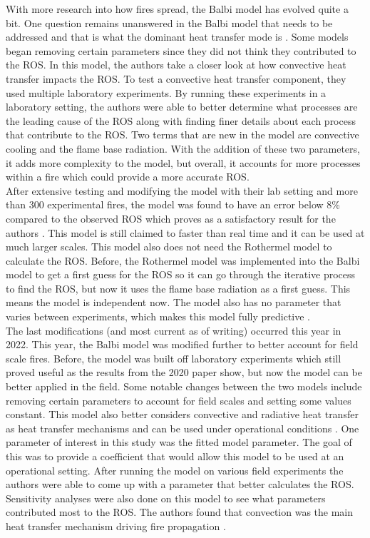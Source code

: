 \documentclass{article}
\begin{document}
\indent With more research into how fires spread, the Balbi model has evolved quite a bit. One question remains unanswered in the Balbi model that needs to be addressed and that is what the dominant heat transfer mode is \citep{Balbi2020}. Some models began removing certain parameters since they did not think they contributed to the ROS. In this model, the authors take a closer look at how convective heat transfer impacts the ROS. To test a convective heat transfer component, they used multiple laboratory experiments. By running these experiments in a laboratory setting, the authors were able to better determine what processes are the leading cause of the ROS along with finding finer details about each process that contribute to the ROS. Two terms that are new in the model are convective cooling and the flame base radiation. With the addition of these two parameters, it adds more complexity to the model, but overall, it accounts for more processes within a fire which could provide a more accurate ROS. \\
\indent After extensive testing and modifying the model with their lab setting and more than 300 experimental fires, the model was found to have an error below 8\% compared to the observed ROS which proves as a satisfactory result for the authors \citep{Balbi2020}. This model is still claimed to faster than real time and it can be used at much larger scales. This model also does not need the Rothermel model to calculate the ROS. Before, the Rothermel model was implemented into the Balbi model to get a first guess for the ROS so it can go through the iterative process to find the ROS, but now it uses the flame base radiation as a first guess. This means the model is independent now. The model also has no parameter that varies between experiments, which makes this model fully predictive \citep{Chatelon2022}.  \\
\indent The last modifications (and most current as of writing) occurred this year in 2022. This year, the Balbi model was modified further to better account for field scale fires. Before, the model was built off laboratory experiments which still proved useful as the results from the 2020 paper show, but now the model can be better applied in the field. Some notable changes between the two models include removing certain parameters to account for field scales and setting some values constant. This model also better considers convective and radiative heat transfer as heat transfer mechanisms and can be used under operational conditions \citep{Chatelon2022}. One parameter of interest in this study was the fitted model parameter. The goal of this was to provide a coefficient that would allow this model to be used at an operational setting. After running the model on various field experiments the authors were able to come up with a parameter that better calculates the ROS. Sensitivity analyses were also done on this model to see what parameters contributed most to the ROS. The authors found that convection was the main heat transfer mechanism driving fire propagation \citep{Chatelon2022}. \\
\end{document}
